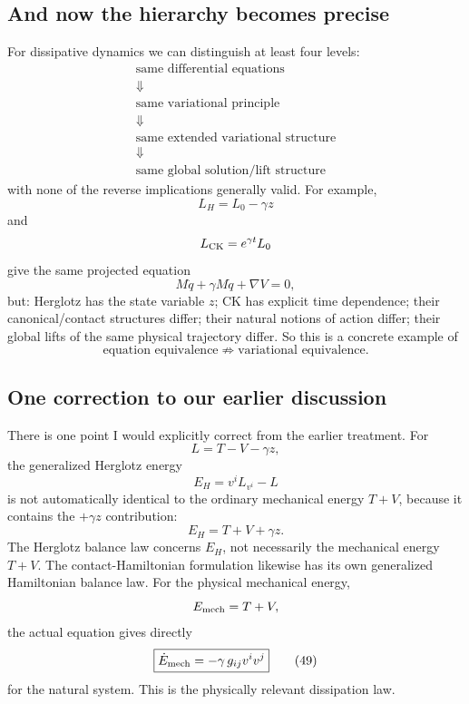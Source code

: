 \subsection{And now the hierarchy becomes precise}

For dissipative dynamics we can distinguish at least four levels:
$$ \boxed{ \begin{array}{c} \text{same differential equations}\\ \Downarrow\\ \text{same variational principle}\\ \Downarrow\\ \text{same extended variational structure}\\ \Downarrow\\ \text{same global solution/lift structure} \end{array}} $$
with none of the reverse implications generally valid.
For example,
$$ L_H=L_0-\gamma z $$
and
$$ L_{\rm CK}=e^{\gamma t}L_0 $$
give the same projected equation
$$ M\ddot q+\gamma M\dot q+\nabla V=0, $$
but:
Herglotz has the state variable \(z\);
CK has explicit time dependence;
their canonical/contact structures differ;
their natural notions of action differ;
their global lifts of the same physical trajectory differ.
So this is a concrete example of
$$ \boxed{ \text{equation equivalence} \not\Rightarrow \text{variational equivalence}. } $$

\subsection{One correction to our earlier discussion}

There is one point I would explicitly correct from the earlier treatment.
For
$$ L=T-V-\gamma z, $$
the generalized Herglotz energy
$$ E_H=v^iL_{v^i}-L $$
is not automatically identical to the ordinary mechanical energy \(T+V\), because it contains the \(+\gamma z\) contribution:
\begin{equation}
 E_H = T+V+\gamma z. \tag{48} 
\end{equation}
The Herglotz balance law concerns \(E_H\), not necessarily the mechanical energy \(T+V\). The contact-Hamiltonian formulation likewise has its own generalized Hamiltonian balance law.
For the physical mechanical energy,
$$ E_{\rm mech}=T+V, $$
the actual equation gives directly
\begin{equation}
 \boxed{ \dot E_{\rm mech} = -\gamma\,g_{ij}v^iv^j } \tag{49} 
\end{equation}
for the natural system.
This is the physically relevant dissipation law.

